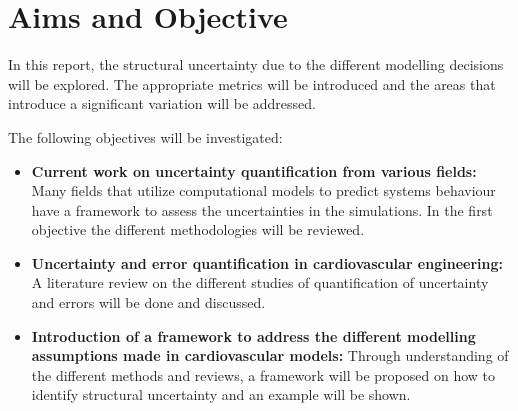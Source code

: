 \chapter{Aims and Objective}
\label{chapterlabel4}

In this report, the structural uncertainty due to the different modelling decisions will be explored. The appropriate metrics will be introduced and the areas that introduce a significant variation will be addressed.\par

The following objectives will be investigated:
\begin{itemize}
    \item \textbf{Current work on uncertainty quantification from various fields:} Many fields that utilize computational models to predict systems behaviour have a framework to assess the uncertainties in the simulations. In the first objective the different methodologies will be reviewed.
    \item \textbf{Uncertainty and error quantification in cardiovascular engineering:} A literature review on the different studies of quantification of uncertainty and errors will be done and discussed.
    \item \textbf{Introduction of a framework to address the different modelling assumptions made in cardiovascular models:} Through understanding of the different methods and reviews, a framework will be proposed on how to identify structural uncertainty and an example will be shown.
\end{itemize}